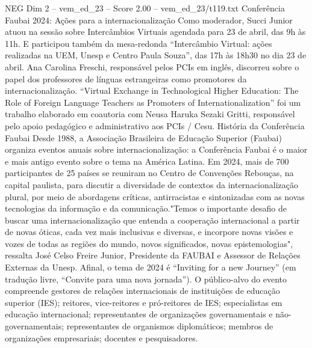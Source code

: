 \begin{textsample}{NEG Dim 2 – vem\_ed\_23 – Score 2.00 – vem\_ed\_23/t119.txt}  \label{ex:f2_neg_080}
Conferência Faubai 2024: Ações para a internacionalização Como moderador, Succi Junior atuou na sessão sobre Intercâmbios Virtuais agendada para 23 de abril, das 9h às 11h.
E participou também da mesa-redonda “Intercâmbio Virtual: ações realizadas na UEM, Unesp e Centro Paula Souza”, das 17h às 18h30 no dia 23 de abril.
Ana Carolina Freschi, responsável pelos PCIs em inglês, discorreu sobre o papel dos professores de línguas estrangeiras como promotores da internacionalização. “Virtual Exchange in Technological Higher Education: The Role of Foreign Language Teachers as Promoters of Internationalization” foi um trabalho elaborado em coautoria com Neusa Haruka Sezaki Gritti, responsável pelo apoio pedagógico e administrativo aos PCIs / Cesu.
História da Conferência Faubai Desde 1988, a Associação Brasileira de Educação Superior (Faubai) organiza eventos anuais sobre internacionalização: a Conferência Faubai é o maior e mais antigo evento sobre o tema na América Latina.
Em 2024, mais de 700 participantes de 25 países se reuniram no Centro de Convenções Rebouças, na capital paulista, para discutir a diversidade de contextos da internacionalização plural, por meio de abordagens críticas, antirracistas e sintonizadas com as novas tecnologias da informação e da comunicação."Temos o importante desafio de buscar uma internacionalização que entenda a cooperação internacional a partir de novas óticas, cada vez mais inclusivas e diversas, e incorpore novas visões e vozes de todas as regiões do mundo, novos significados, novas epistemologias", ressalta José Celso Freire Junior, Presidente da FAUBAI e Assessor de Relações Externas da Unesp.
Afinal, o tema de 2024 é “Inviting for a new Journey” (em tradução livre, “Convite para uma nova jornada”).
O público-alvo do evento compreende gestores de relações internacionais de instituições de educação superior (IES); reitores, vice-reitores e pró-reitores de IES; especialistas em educação internacional; representantes de organizações governamentais e não-governamentais; representantes de organismos diplomáticos; membros de organizações empresariais; docentes e pesquisadores.

\end{textsample}
